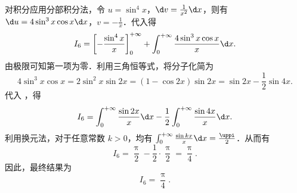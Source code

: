 \begin{solution}
    对积分应用分部积分法，令 $u = \sin^4 x$，$\d v = \frac{1}{x^2} \d x$，则有 $\d u = 4\sin^3 x \cos x \d x$，$v = -\frac{1}{x}$．代入得
    \begin{equation}\label{eq:int6-1}
        I_6 = \left[ -\frac{\sin^4 x}{x} \right]_{0}^{+\infty} + \int_{0}^{+\infty} \frac{4\sin^3 x \cos x}{x} \d x.
    \end{equation}
    由极限可知第一项为零．利用三角恒等式，将分子化简为
    \begin{equation}\label{eq:int6-2}
        4\sin^3 x \cos x = 2\sin^2 x \sin 2x = (1 - \cos 2x) \sin 2x = \sin 2x - \frac{1}{2} \sin 4x.
    \end{equation}
    代入 ，得
    \begin{equation}\label{eq:int6-3}
        I_6 = \int_{0}^{+\infty} \frac{\sin 2x}{x} \d x - \frac{1}{2} \int_{0}^{+\infty} \frac{\sin 4x}{x} \d x.
    \end{equation}
    利用换元法，对于任意常数 $k > 0$，均有 $\int_{0}^{+\infty} \frac{\sin kx}{x} \d x = \frac{\uppi}{2}$．从而有
    \begin{equation}\label{eq:int6-4}
        I_6 = \frac{\uppi}{2} - \frac{1}{2} \cdot \frac{\uppi}{2} = \frac{\uppi}{4}.
    \end{equation}
    因此，最终结果为
    \begin{equation}
        I_6 = \boxed{\frac{\uppi}{4}}.
    \end{equation}
\end{solution}

\endinput
